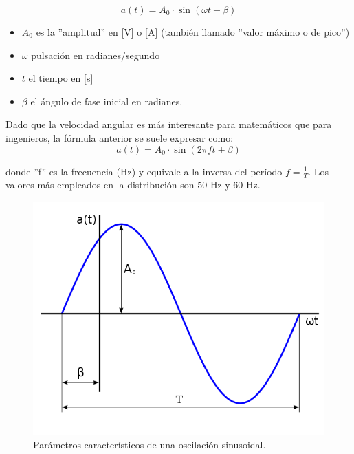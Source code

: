\documentclass{article}
\begin{document}
\begin{equation}
    a(t)=A_0 \cdot \sin(\omega t + \beta)
\end{equation}
\begin{itemize}
    \item $A_0$ es la ''amplitud'' en [V] o [A] (también llamado ''valor máximo o de pico'')
    
    \item $\omega$  pulsación en radianes/segundo
    
    \item $t$ el tiempo en [s]
    
    \item $\beta$ el ángulo de fase inicial en radianes.
\end{itemize}


Dado que la velocidad angular es más interesante para matemáticos que para ingenieros, la fórmula anterior se suele expresar como:\citep{CA}\\

\begin{equation}
    a(t)=A_0 \cdot \sin(2 \pi f t + \beta)
\end{equation}


donde ''f'' es la frecuencia (Hz) y equivale a la inversa del período $f=\frac{1}{T}$. Los valores más empleados en la distribución son 50 Hz y 60 Hz.\citep{CA}


\begin{figure}[h!]
    \centering
    \includegraphics[scale=0.5]{Imagenes/600px-OndaSenoidal.png}
    \caption{Parámetros característicos de una oscilación sinusoidal.}
    \label{fig:ondaSenoidal}
\end{figure}
\end{document}
